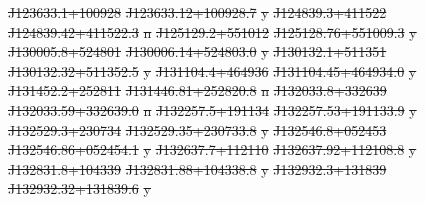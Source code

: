 \documentclass[11pt, a4paper]{book}
\providecommand{\DIFdeltex}[1]{{\protect\color{red}\sout{#1}}}                      %
\providecommand{\DIFdelFL}[1]{\DIFdel{#1}} %
\providecommand{\DIFdel}[1]{\texorpdfstring{\DIFdeltex{#1}}{}} %
\begin{document}
\DIFdelFL{J123633.1+100928 }%
\DIFdelFL{J123633.12+100928.7 }%
\DIFdelFL{y}%
\DIFdelFL{J124839.3+411522 }%
\DIFdelFL{J124839.42+411522.3 }%
\DIFdelFL{n}%
\DIFdelFL{J125129.2+551012 }%
\DIFdelFL{J125128.76+551009.3 }%
\DIFdelFL{y}%
\DIFdelFL{J130005.8+524801 }%
\DIFdelFL{J130006.14+524803.0 }%
\DIFdelFL{y}%
\DIFdelFL{J130132.1+511351 }%
\DIFdelFL{J130132.32+511352.5 }%
\DIFdelFL{y}%
\DIFdelFL{J131104.4+464936 }%
\DIFdelFL{J131104.45+464934.0 }%
\DIFdelFL{y}%
\DIFdelFL{J131452.2+252811 }%
\DIFdelFL{J131446.81+252820.8 }%
\DIFdelFL{n}%
\DIFdelFL{J132033.8+332639 }%
\DIFdelFL{J132033.59+332639.0 }%
\DIFdelFL{n}%
\DIFdelFL{J132257.5+191134 }%
\DIFdelFL{J132257.53+191133.9 }%
\DIFdelFL{y}%
\DIFdelFL{J132529.3+230734 }%
\DIFdelFL{J132529.35+230733.8 }%
\DIFdelFL{y}%
\DIFdelFL{J132546.8+052453 }%
\DIFdelFL{J132546.86+052454.1 }%
\DIFdelFL{y}%
\DIFdelFL{J132637.7+112110 }%
\DIFdelFL{J132637.92+112108.8 }%
\DIFdelFL{y}%
\DIFdelFL{J132831.8+104339 }%
\DIFdelFL{J132831.88+104338.8 }%
\DIFdelFL{y}%
\DIFdelFL{J132932.3+131839 }%
\DIFdelFL{J132932.32+131839.6 }%
\DIFdelFL{y}%
\end{document}

